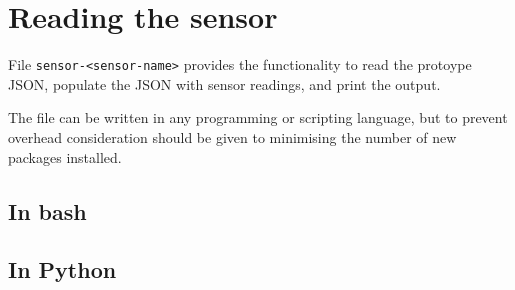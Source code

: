 \documentclass[
]{book}
\newenvironment{Shaded}{\begin{snugshade}}{\end{snugshade}}
\newcommand{\AttributeTok}[1]{\textcolor[rgb]{0.13,0.29,0.53}{#1}}
\newcommand{\BuiltInTok}[1]{#1}
\newcommand{\CommentTok}[1]{\textcolor[rgb]{0.56,0.35,0.01}{\textit{#1}}}
\newcommand{\DataTypeTok}[1]{\textcolor[rgb]{0.13,0.29,0.53}{#1}}
\newcommand{\ExtensionTok}[1]{#1}
\newcommand{\KeywordTok}[1]{\textcolor[rgb]{0.13,0.29,0.53}{\textbf{#1}}}
\newcommand{\OperatorTok}[1]{\textcolor[rgb]{0.81,0.36,0.00}{\textbf{#1}}}
\newcommand{\StringTok}[1]{\textcolor[rgb]{0.31,0.60,0.02}{#1}}
\newcommand{\VariableTok}[1]{\textcolor[rgb]{0.00,0.00,0.00}{#1}}
\begin{document}
\section{Reading the sensor}\label{reading-the-sensor}

File \texttt{sensor-\textless{}sensor-name\textgreater{}} provides the functionality to read the protoype JSON, populate the JSON with sensor readings, and print the output.

The file can be written in any programming or scripting language, but to prevent overhead consideration should be given to minimising the number of new packages installed.

\subsection{In bash}\label{in-bash}

\begin{Shaded}
\end{Shaded}

\subsection{In Python}\label{in-python}
\end{document}
